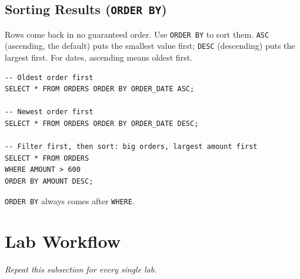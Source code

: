 \documentclass[12pt,a4paper]{article}
\begin{document}
\subsection{Sorting Results (\texttt{ORDER BY})}
Rows come back in no guaranteed order. Use \texttt{ORDER BY} to sort them. \texttt{ASC} (ascending, the default) puts the smallest value first; \texttt{DESC} (descending) puts the largest first. For dates, ascending means oldest first.
\begin{lstlisting}
-- Oldest order first
SELECT * FROM ORDERS ORDER BY ORDER_DATE ASC;

-- Newest order first
SELECT * FROM ORDERS ORDER BY ORDER_DATE DESC;

-- Filter first, then sort: big orders, largest amount first
SELECT * FROM ORDERS
WHERE AMOUNT > 600
ORDER BY AMOUNT DESC;
\end{lstlisting}
\texttt{ORDER BY} always comes after \texttt{WHERE}.

\newpage
\section*{Lab Workflow}

\textit{Repeat this subsection for every single lab.}
\end{document}
